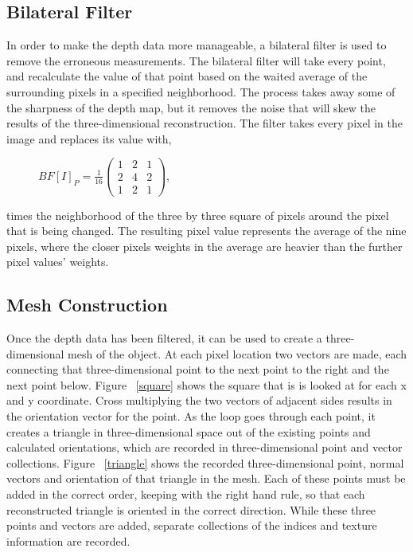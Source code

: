 \documentclass[pdftex,10.5pt]{report}
\begin{document}
\subsection{Bilateral Filter}
In order to make the depth data more manageable, a bilateral filter is used to remove the erroneous measurements. The bilateral filter will take every point, and recalculate the value of that point based on the waited average of the surrounding pixels in a specified neighborhood. The process takes away some of the sharpness of the depth map, but it removes the noise that will skew the results of the three-dimensional reconstruction. The filter takes every pixel in the image and replaces its value with,
\begin{figure}[H]
\centering
 $BF[I]_{P} = \frac{1}{16} \left( \begin{array}{ccc}
1 & 2 & 1 \\
2 & 4 & 2 \\
1 & 2 & 1 \end{array}  \right)$,
\end{figure}
times the neighborhood of the three by three square of pixels around the pixel that is being changed. The resulting pixel value represents the average of the nine pixels, where the closer pixels weights in the average are heavier than the further pixel values' weights.  

\subsection{Mesh Construction}
Once the depth data has been filtered, it can be used to create a three-dimensional mesh of the object. At each pixel location two vectors are made, each connecting that three-dimensional point to the next point to the right and the next point below. Figure ~\ref{square} shows the square that is is looked at for each x and y coordinate. Cross multiplying the two vectors of adjacent sides results in the orientation vector for the point. As the loop goes through each point, it creates a triangle in three-dimensional space out of the existing points and calculated orientations, which are recorded in three-dimensional point and vector collections. Figure ~\ref{triangle} shows the recorded three-dimensional point, normal vectors and orientation of that triangle in the mesh. Each of these points must be added in the correct order, keeping with the right hand rule, so that each reconstructed triangle is oriented in the correct direction. While these three points and vectors are added, separate collections of the indices and texture information are recorded. 
\end{document}
